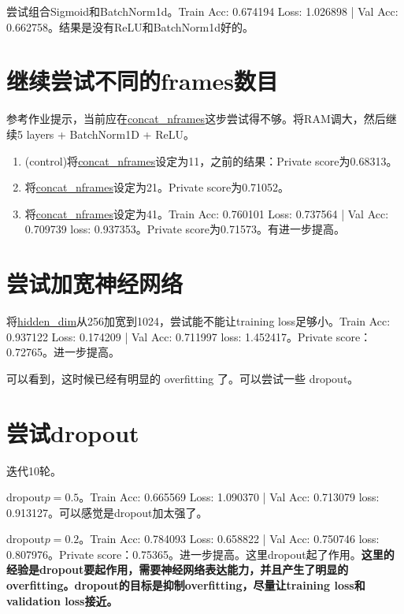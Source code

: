 \documentclass{article}
\begin{document}
\begin{CJK}{UTF8}{gbsn}
尝试组合Sigmoid和BatchNorm1d。Train Acc: 0.674194 Loss: 1.026898 | Val Acc: 0.662758。结果是没有ReLU和BatchNorm1d好的。

\section{继续尝试不同的frames数目}

参考作业提示，当前应在\url{concat_nframes}这步尝试得不够。将RAM调大，然后继续5 layers + BatchNorm1D + ReLU。

\begin{enumerate}
	\item (control)将\url{concat_nframes}设定为11，之前的结果：Private score为0.68313。
	\item 将\url{concat_nframes}设定为21。Private score为0.71052。
	\item 将\url{concat_nframes}设定为41。Train Acc: 0.760101 Loss: 0.737564 | Val Acc: 0.709739 loss: 0.937353。Private score为0.71573。有进一步提高。
\end{enumerate}

\section{尝试加宽神经网络}

将\url{hidden_dim}从256加宽到1024，尝试能不能让training loss足够小。Train Acc: 0.937122 Loss: 0.174209 | Val Acc: 0.711997 loss: 1.452417。Private score：0.72765。进一步提高。

可以看到，这时候已经有明显的 overfitting 了。可以尝试一些 dropout。

\section{尝试dropout}

迭代10轮。

dropout$p = 0.5$。Train Acc: 0.665569 Loss: 1.090370 | Val Acc: 0.713079 loss: 0.913127。可以感觉是dropout加太强了。

dropout$p = 0.2$。Train Acc: 0.784093 Loss: 0.658822 | Val Acc: 0.750746 loss: 0.807976。Private score：0.75365。进一步提高。这里dropout起了作用。\textbf{这里的经验是dropout要起作用，需要神经网络表达能力，并且产生了明显的overfitting。dropout的目标是抑制overfitting，尽量让training loss和validation loss接近。}

\end{CJK}
\end{document}
